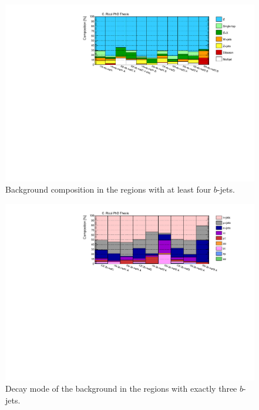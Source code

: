 \begin{figure}[htbp]
\includegraphics[width=\textwidth]{figures/ewk_prod/comp_plots/hh_4b_bkg.pdf}
\caption{Background composition in the regions with at least four $b$-jets.}
	\label{fig:bkgcomp_hh4b}
\end{figure}

\begin{figure}[htbp]
\includegraphics[width=\textwidth]{figures/ewk_prod/comp_plots/hh_3b_tt.pdf}
\caption{Decay mode of the \ttbar background in the regions with exactly three $b$-jets.}
	\label{fig:ttcomp_hh3b}
\end{figure}

